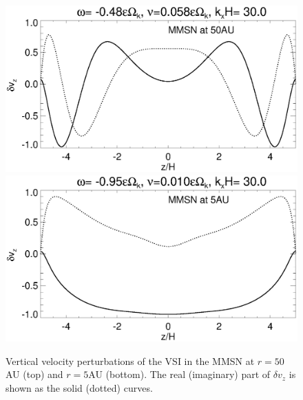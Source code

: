 \begin{figure}
  \includegraphics[width=\linewidth,clip=true,trim=0cm 1.75cm 0cm
  0cm]{figures/eigenvectorvz_mmsn_50AU}
  \includegraphics[width=\linewidth,clip=true,trim=0cm 0.0cm 0cm
  0cm]{figures/eigenvectorvz_mmsn_5AU}
  \caption{Vertical velocity perturbations of the VSI in the MMSN at 
    $r=50$AU (top) and $r=5$AU (bottom). The real (imaginary) part of 
    $\delta v_z$ is shown as
    the solid (dotted) curves. 
    \label{mmsn_eigenvz}}
\end{figure}
